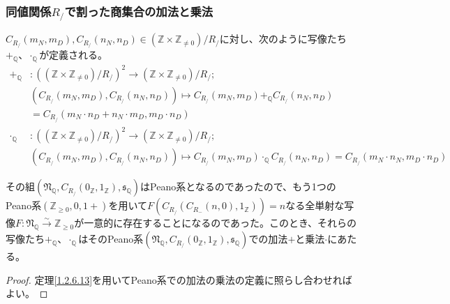 \documentclass[dvipdfmx]{jsarticle}
\begin{document}
\subsubsection{同値関係$R_{/}$で割った商集合の加法と乗法}%
\begin{dfn}
$C_{R_{/}}\left( m_{N},m_{D} \right),C_{R_{/}}\left( n_{N},n_{D} \right) \in \left( \mathbb{Z} \times \mathbb{Z}_{\neq 0} \right) /R_{/} $に対し、次のように写像たち$+_{\mathbb{Q}}$、$\cdot_{\mathbb{Q}}$が定義される。
\begin{align*}
+_{\mathbb{Q}}&:\left( \left( \mathbb{Z} \times \mathbb{Z}_{\neq 0} \right) /R_{/}  \right)^{2} \rightarrow \left( \mathbb{Z} \times \mathbb{Z}_{\neq 0} \right) /R_{/} ;\\
&\left( C_{R_{/}}\left( m_{N},m_{D} \right),C_{R_{/}}\left( n_{N},n_{D} \right) \right) \mapsto C_{R_{/}}\left( m_{N},m_{D} \right) +_{\mathbb{Q}}C_{R_{/}}\left( n_{N},n_{D} \right) \\
&= C_{R_{/}}\left( m_{N} \cdot n_{D} + n_{N} \cdot m_{D},m_{D} \cdot n_{D} \right)\\
\cdot_{\mathbb{Q}}&:\left( \left( \mathbb{Z} \times \mathbb{Z}_{\neq 0} \right) /R_{/}  \right)^{2} \rightarrow \left( \mathbb{Z} \times \mathbb{Z}_{\neq 0} \right) /R_{/} ;\\
&\left( C_{R_{/}}\left( m_{N},m_{D} \right),C_{R_{/}}\left( n_{N},n_{D} \right) \right) \mapsto C_{R_{/}}\left( m_{N},m_{D} \right) \cdot_{\mathbb{Q}}C_{R_{/}}\left( n_{N},n_{D} \right) = C_{R_{/}}\left( m_{N} \cdot n_{N},m_{D} \cdot n_{D} \right)
\end{align*}
\end{dfn}
\begin{thm}\label{1.2.6.14}
その組$\left( \mathfrak{N}_{\mathbb{Q}},C_{R_{/}}\left( 0_{\mathbb{Z}},1_{\mathbb{Z}} \right),\mathfrak{s}_{\mathbb{Q}} \right)$はPeano系となるのであったので、もう1つのPeano系$\left( \mathbb{Z}_{\geq 0},0,1 + \right)$を用いて$F\left( C_{R_{/}}\left( C_{R_{-}}(n,0),1_{\mathbb{Z}} \right) \right) = n$なる全単射な写像$F:\mathfrak{N}_{\mathbb{Q}}\overset{\sim}{\rightarrow}\mathbb{Z}_{\geq 0}$が一意的に存在することになるのであった。このとき、それらの写像たち$+_{\mathbb{Q}}$、$\cdot_{\mathbb{Q}}$はそのPeano系$\left( \mathfrak{N}_{\mathbb{Q}},C_{R_{/}}\left( 0_{\mathbb{Z}},1_{\mathbb{Z}} \right),\mathfrak{s}_{\mathbb{Q}} \right)$での加法$+$と乗法$\cdot$にあたる。
\end{thm}
\begin{proof}
定理\ref{1.2.6.13}を用いてPeano系での加法の乗法の定義に照らし合わせればよい。
\end{proof}
\end{document}
